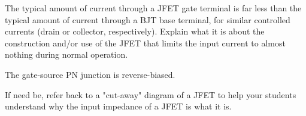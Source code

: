 

The typical amount of current through a JFET gate terminal is far less than the typical amount of current through a BJT base terminal, for similar controlled currents (drain or collector, respectively).  Explain what it is about the construction and/or use of the JFET that limits the input current to almost nothing during normal operation.







The gate-source PN junction is reverse-biased.







If need be, refer back to a "cut-away" diagram of a JFET to help your students understand why the input impedance of a JFET is what it is.




